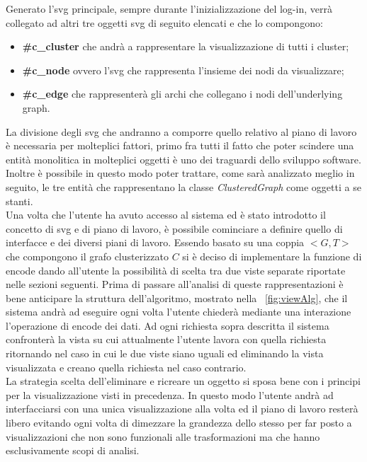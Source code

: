 {Generato l'svg principale, sempre durante l'inizializzazione del log-in, verrà collegato ad altri tre oggetti svg di seguito elencati e che lo compongono:
\begin{itemize}
	\item \textbf{\#c\_cluster} che andrà a rappresentare la visualizzazione di tutti i cluster; 
	\item \textbf{\#c\_node} ovvero l'svg che rappresenta l'insieme dei nodi da visualizzare;
	\item \textbf{\#c\_edge} che rappresenterà gli archi che collegano i nodi dell'underlying graph.
\end{itemize}
La divisione degli svg che andranno a comporre quello relativo al piano di lavoro è necessaria per molteplici fattori, primo fra tutti il fatto che poter scindere una entità monolitica in molteplici oggetti è uno dei traguardi dello sviluppo software. Inoltre è possibile in questo modo poter trattare, come sarà analizzato meglio in seguito, le tre entità che rappresentano la classe \textit{ClusteredGraph} come oggetti a se stanti.\\
Una volta che l'utente ha avuto accesso al sistema ed è stato introdotto il concetto di svg e di piano di lavoro, è possibile cominciare a definire quello di interfacce e dei diversi piani di lavoro.
Essendo basato su una coppia $<G,T>$ che compongono il grafo clusterizzato $C$ si è deciso di implementare la funzione di encode dando all'utente la possibilità di scelta tra due viste separate riportate nelle sezioni seguenti. Prima di passare all'analisi di queste rappresentazioni è bene anticipare la struttura dell'algoritmo, mostrato nella \figurename~\ref{fig:viewAlg}, che il sistema andrà ad eseguire ogni volta l'utente chiederà mediante una interazione l'operazione di encode dei dati. Ad ogni richiesta sopra descritta il sistema confronterà la vista su cui attualmente l'utente lavora con quella richiesta ritornando nel caso in cui le due viste siano uguali ed eliminando la vista visualizzata e creano quella richiesta nel caso contrario.\\
La strategia scelta dell'eliminare e ricreare un oggetto si sposa bene con i principi per la visualizzazione visti in precedenza. In questo modo l'utente andrà ad interfacciarsi con una unica visualizzazione alla volta ed il piano di lavoro resterà libero evitando ogni volta di dimezzare la grandezza dello stesso per far posto a visualizzazioni che non sono funzionali alle trasformazioni ma che hanno esclusivamente scopi di analisi.
\begin{figure}[!htb]

\end{figure}}
